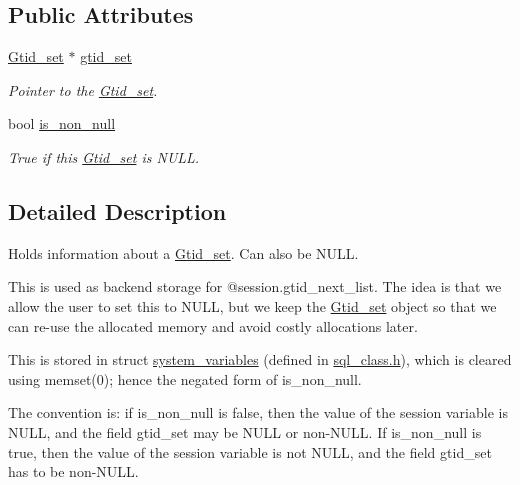 \subsection*{Public Attributes}
\begin{DoxyCompactItemize}
\item 
\mbox{\label{structGtid__set__or__null_a3fd61ef2c21ef9f8ae1b0b3f47b9be01}} 
\mbox{\hyperlink{classGtid__set}{Gtid\+\_\+set}} $\ast$ \mbox{\hyperlink{structGtid__set__or__null_a3fd61ef2c21ef9f8ae1b0b3f47b9be01}{gtid\+\_\+set}}
\begin{DoxyCompactList}\small\item\em Pointer to the \mbox{\hyperlink{classGtid__set}{Gtid\+\_\+set}}. \end{DoxyCompactList}\item 
\mbox{\label{structGtid__set__or__null_afa7c80306b461171a9d594df055592a0}} 
bool \mbox{\hyperlink{structGtid__set__or__null_afa7c80306b461171a9d594df055592a0}{is\+\_\+non\+\_\+null}}
\begin{DoxyCompactList}\small\item\em True if this \mbox{\hyperlink{classGtid__set}{Gtid\+\_\+set}} is N\+U\+LL. \end{DoxyCompactList}\end{DoxyCompactItemize}


\subsection{Detailed Description}
Holds information about a \mbox{\hyperlink{classGtid__set}{Gtid\+\_\+set}}. Can also be N\+U\+LL.

This is used as backend storage for @session.\+gtid\+\_\+next\+\_\+list. The idea is that we allow the user to set this to N\+U\+LL, but we keep the \mbox{\hyperlink{classGtid__set}{Gtid\+\_\+set}} object so that we can re-\/use the allocated memory and avoid costly allocations later.

This is stored in struct \mbox{\hyperlink{structsystem__variables}{system\+\_\+variables}} (defined in \mbox{\hyperlink{sql__class_8h_source}{sql\+\_\+class.\+h}}), which is cleared using memset(0); hence the negated form of is\+\_\+non\+\_\+null.

The convention is\+: if is\+\_\+non\+\_\+null is false, then the value of the session variable is N\+U\+LL, and the field gtid\+\_\+set may be N\+U\+LL or non-\/N\+U\+LL. If is\+\_\+non\+\_\+null is true, then the value of the session variable is not N\+U\+LL, and the field gtid\+\_\+set has to be non-\/N\+U\+LL.

